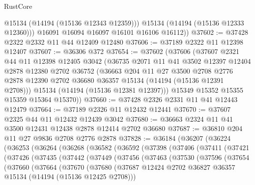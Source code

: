 \begin{lexlean}{RustCore}
\begin{coremodule}
            @15134
            (@14194 (@15136 @12343 @12359)))
          @15134
          (@14194 (@15136 @12333 @12360)))
        @16091
        @16094
        @16097
        @16101
        @16106
        @16112))
@37602 := @37428 @2322 @2332 @11 @44 @12409 @12480
@37606 := @37189 @2322 @11 @12398 @12407
@37607 := @36306 @372
@37654 := @37602
    (@37606
      (@37607
        @2321
        @44
        @11
        @12398
        @12405
        @3042
        (@36735
          @2071
          @11
          @41
          @3502
          @12397
          @12404
          @2878
          @12380
          @2702
          @36752
          (@36663
            @204
            @11
            @27
            @3500
            @2708
            @2776
            @2878
            @12390
            @2702
            @36680
            @36357
            @15134
            (@14194 (@15136 @12391 @2708)))
          @15134
          (@14194 (@15136 @12381 @12397)))
        @15349
        @15352
        @15355
        @15359
        @15364
        @15370))
@37660 := @37428 @2326 @2331 @11 @41 @12443 @12479
@37664 := @37189 @2326 @11 @12432 @12441
@37670 := @37607 @2325 @44 @11 @12432 @12439 @3042
@37680 := @36663 @2324 @11 @41 @3500 @12431 @12438 @2878 @12414 @2702 @36680
@37687 := @36810 @204 @11 @27 @9836 @2708 @2776 @2878
@37828 := @36184
    (@36207
      (@36224
        (@36253
          (@36264
            (@36268
              (@36582
                (@36592
                  (@37398
                    (@37406
                      (@37411
                        (@37421
                          (@37426
                            (@37435
                              (@37442
                                (@37449
                                  (@37456
                                    (@37463
                                      (@37530
                                        (@37596
                                          (@37654
                                            (@37660
                                              (@37664
                                                (@37670
                                                  (@37680
                                                    (@37687
                                                      @12424
                                                      @2702
                                                      @36827
                                                      @36357
                                                      @15134
                                                      (@14194 (@15136 @12425 @2708)))

\end{coremodule}
\end{lexlean}
